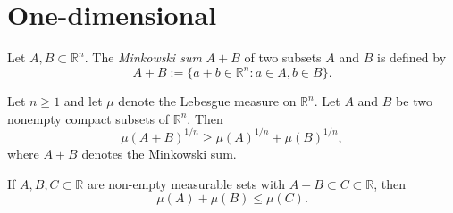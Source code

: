 \section{One-dimensional}

\begin{definition}
    Let \(A, B \subset \mathbb{R}^n\). The \textit{Minkowski sum} \(A+B\) of two subsets \(A\) and \(B\) is defined by
    \begin{equation*}
        A+B:= \{a+b\in\mathbb{R}^n : a \in A, b \in B\}.
    \end{equation*}
\end{definition}

\begin{theorem}
    Let \(n \geq 1\) and let \(\mu\) denote the Lebesgue measure on \(\mathbb{R}^n\). Let \(A\) and \(B\) be two nonempty compact subsets of \(\mathbb{R}^n\). Then
    \begin{equation*}
        \mu(A+B)^{1/n} \geq \mu(A)^{1/n} + \mu(B)^{1/n},
    \end{equation*}
    where \(A+B\) denotes the Minkowski sum.
\end{theorem}

\begin{lemma}
    If \(A, B, C \subset \mathbb{R}\) are non-empty measurable sets with \(A+B\subset C \subset \mathbb{R}\), then
    \begin{equation*}
        \mu(A) + \mu(B) \leq \mu(C).
    \end{equation*}
\end{lemma}

